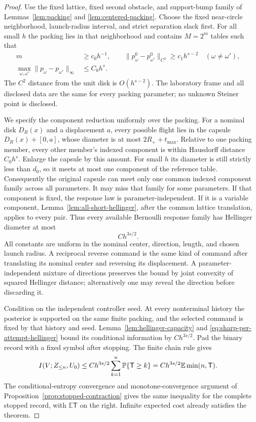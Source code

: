 \begin{proof}
Use the fixed lattice, fixed second obstacle, and support-bump family
of Lemmas~\ref{lem:packing} and \ref{lem:centered-packing}.
Choose the fixed near-circle neighborhood, launch-radius interval, and
strict separation slack first. For all small $h$ the packing lies in
that neighborhood and contains $M=2^m$ tables such that
\begin{align*}
 m&\ge c_0h^{-1},\qquad
 \|p^0_\omega-p^0_{\omega'}\|_{C^2}
                  \ge c_1h^{s-2}\quad(\omega\ne\omega'),\\
 \max_{\omega,\omega'}\|p_\omega-p_{\omega'}\|_\infty
                  &\le C_0h^s.
\end{align*}
The $C^2$ distance from the unit disk is $O(h^{s-2})$.
The laboratory frame and all disclosed data are the same for every
packing parameter; no unknown Steiner point is disclosed.

We specify the component reduction uniformly over the packing.
For a nominal disk $D_R(x)$ and a displacement $a$, every possible
flight lies in the capsule $D_R(x)+[0,a]$, whose diameter is at
most $2R_++t_{\max}$. Relative to one packing member, every other
member's indexed component is within Hausdorff distance $C_0h^s$.
Enlarge the capsule by this amount. For small $h$ its diameter is
still strictly less than $d_0$, so it meets at most one component
of the reference table. Consequently the original capsule can meet
only one common indexed component family across all parameters.
It may miss that family for some parameters. If that component is
fixed, the response law is parameter-independent. If it is a variable
component, Lemma~\ref{lem:all-short-hellinger}, after the common
lattice translation, applies to every pair. Thus every available
Bernoulli response family has Hellinger diameter at most
\begin{equation}\label{eq:sharp-per-attempt-hellinger}
                             C h^{3s/2}.
\end{equation}
All constants are uniform in the nominal center, direction, length,
and chosen launch radius. A reciprocal reverse command is the same
kind of command after translating its nominal center and reversing
its displacement. A parameter-independent mixture of directions
preserves the bound by joint convexity of squared Hellinger distance;
alternatively one may reveal the direction before discarding it.

Condition on the independent controller seed. At every nonterminal
history the posterior is supported on the same finite packing, and
the selected command is fixed by that history and seed.
Lemma~\ref{lem:hellinger-capacity} and
\eqref{eq:sharp-per-attempt-hellinger} bound its conditional
information by $C h^{3s/2}$. Pad the binary record with a fixed
symbol after stopping. The finite chain rule gives
\[
 I(V;Z_{\le n},U_0)
     \le C h^{3s/2}\sum_{k=1}^n\mathbb P\{\mathsf T\ge k\}
     = C h^{3s/2}\mathbb E\min(n,\mathsf T).
\]
The conditional-entropy convergence and monotone-convergence argument
of Proposition~\ref{prop:stopped-contraction} gives the same
inequality for the complete stopped record, with
$\mathbb E\mathsf T$ on the right. Infinite expected cost already
satisfies the theorem.


\end{proof}
